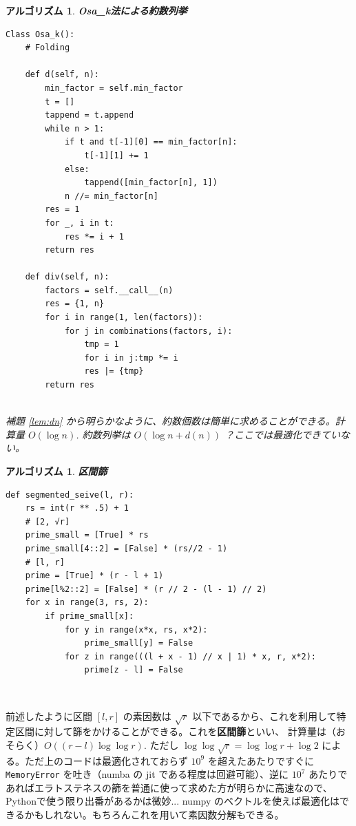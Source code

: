 \documentclass[12pt, a4j]{ltjsarticle}
\newtheorem{alg}[thm]{アルゴリズム}
\begin{document}
\vspace{1cm}

\begin{alg} {\bf Osa\_k法による約数列挙} \upshape\\
\begin{lstlisting}
Class Osa_k():
    # Folding

    def d(self, n):
        min_factor = self.min_factor
        t = []
        tappend = t.append
        while n > 1:
            if t and t[-1][0] == min_factor[n]:
                t[-1][1] += 1
            else:
                tappend([min_factor[n], 1])
            n //= min_factor[n]
        res = 1
        for _, i in t:
            res *= i + 1
        return res

    def div(self, n):
        factors = self.__call__(n)
        res = {1, n}
        for i in range(1, len(factors)):
            for j in combinations(factors, i):
                tmp = 1
                for i in j:tmp *= i
                res |= {tmp}
        return res
\end{lstlisting}
\quad\\\itshape
補題 \ref{lem:dn} から明らかなように、約数個数は簡単に求めることができる。計算量 $O(\log n)$. 約数列挙は $O(\log n+d(n))$ ？ここでは最適化できていない。
\end{alg}



\vspace{1cm}

\begin{alg} {\bf 区間篩}\\\upshape
\begin{lstlisting}
def segmented_seive(l, r):
    rs = int(r ** .5) + 1
    # [2, √r]
    prime_small = [True] * rs
    prime_small[4::2] = [False] * (rs//2 - 1)
    # [l, r]
    prime = [True] * (r - l + 1)
    prime[l%2::2] = [False] * (r // 2 - (l - 1) // 2)
    for x in range(3, rs, 2):
        if prime_small[x]:
            for y in range(x*x, rs, x*2):
                prime_small[y] = False
            for z in range(((l + x - 1) // x | 1) * x, r, x*2):
                prime[z - l] = False
\end{lstlisting}
\quad\\
\end{alg}
前述したように区間 $[l, r]$ の素因数は $\sqrt{r}$ 以下であるから、これを利用して特定区間に対して篩をかけることができる。これを{\bf 区間篩}といい、 計算量は（おそらく）$O((r-l)\log\log r)$. ただし $\log\log\sqrt{r} = \log\log r + \log 2$ による。ただ上のコードは最適化されておらず $10^9$ を超えたあたりですぐに \lstinline{MemoryError}
を吐き（numba の jit である程度は回避可能）、逆に $10^7$ あたりであればエラトステネスの篩を普通に使って求めた方が明らかに高速なので、Pythonで使う限り出番があるかは微妙... numpy のベクトルを使えば最適化はできるかもしれない。もちろんこれを用いて素因数分解もできる。
\end{document}
